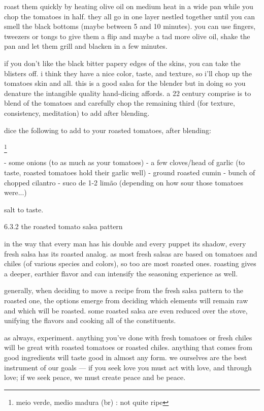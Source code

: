 roast them quickly by heating olive oil on medium heat in a wide pan while you chop the tomatoes in half. they all go in one layer nestled together until you can smell the black bottoms (maybe between 5 and 10 minutes). you can use fingers, tweezers or tongs to give them a flip and maybe a tad more olive oil, shake the pan and let them grill and blacken in a few minutes.

if you don't like the black bitter papery edges of the skins, you can take the blisters off. i think they have a nice color, taste, and texture, so i'll chop up the tomatoes skin and all. this is a good salsa for the blender but in doing so you denature the intangible quality hand-dicing affords. a 22 century comprise is to blend \twothirds of the tomatoes and carefully chop the remaining third (for texture, consistency, meditation) to add after blending.

dice the following to add to your roasted tomatoes, after blending:

\footnote{meio verde, medio madura (br) : not quite ripe}

	-	some onions (\onehalf to \onethird as much as your tomatoes)
	-	a few cloves/head of garlic (to taste, roasted tomatoes hold their garlic well)
	-	ground roasted cumin
	-	\onehalf bunch of chopped cilantro
	-	suco de 1-2 lim\~{a}o (depending on how sour those tomatoes were...)

salt to taste.


6.3.2  the roasted tomato salsa pattern

in the way that every man has his double and every puppet its shadow, every fresh salsa has its roasted analog. as most fresh salsas are based on tomatoes and chiles (of various species and colors), so too are most roasted ones. roasting gives a deeper, earthier flavor and can intensify the seasoning experience as well.

generally, when deciding to move a recipe from the fresh salsa pattern to the roasted one, the options emerge from deciding which elements will remain raw and which will be roasted. some roasted salsa are even reduced over the stove, unifying the flavors and cooking all of the constituents.

as always, experiment. anything you've done with fresh tomatoes or fresh chiles will be great with roasted tomatoes or roasted chiles. anything that comes from good ingredients will taste good in almost any form. we ourselves are the best instrument of our goals --- if you seek love you must act with love, and through love; if we seek peace, we must create peace and be peace.

